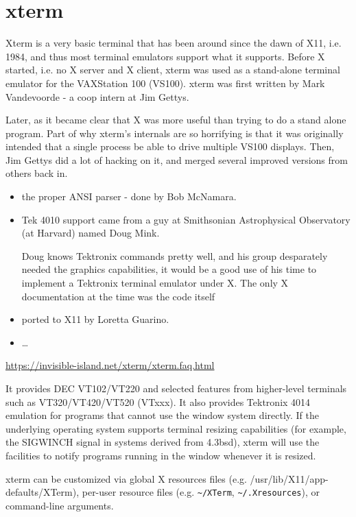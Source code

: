 \section{xterm} 
\label{sec:xterm}


Xterm is a very basic terminal that has been around since the dawn of X11, i.e.
1984, and thus most terminal emulators support what it supports.
Before X started, i.e. no X server and X client, xterm was used as a stand-alone
terminal emulator for the VAXStation 100 (VS100). xterm was first written by
Mark Vandevoorde - a coop intern at Jim Gettys.

Later, as it became clear that X was more useful than trying to do a stand alone
program. Part of why xterm's internals are so horrifying is that it was
originally intended that a single process be able to drive multiple VS100
displays. Then, Jim Gettys did a lot of hacking on it, and merged several
improved versions from others back in.
\begin{itemize}
  \item  the proper ANSI parser - done by Bob McNamara.
  
  \item  Tek 4010 support came from a guy at Smithsonian Astrophysical
  Observatory (at Harvard) named  Doug Mink.
  
  Doug knows Tektronix commands pretty well, and his group desparately needed
  the graphics capabilities, it would be a good use of his time to implement a
  Tektronix terminal emulator under X. The only X documentation at the time was
  the code itself
  
  
  \item ported to X11 by Loretta Guarino.
  
  \item \ldots
\end{itemize}
\url{https://invisible-island.net/xterm/xterm.faq.html}


It provides DEC VT102/VT220 and selected features from higher-level
terminals such as VT320/VT420/VT520 (VTxxx).
It also provides Tektronix 4014 emulation for programs that cannot use the
window system directly.  If the underlying operating system supports terminal
resizing capabilities (for example, the SIGWINCH signal in systems derived from
4.3bsd), xterm will use the facilities to notify programs running in the window
whenever it is resized.  


xterm can be customized via global X resources files (e.g.
/usr/lib/X11/app-defaults/XTerm), per-user resource files (e.g. 
\verb!~/XTerm!, \verb!~/.Xresources!), or command-line arguments. 



